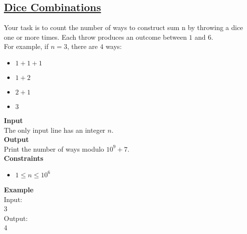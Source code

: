 \subsection{\href{https://cses.fi/problemset/task/1633}{Dice Combinations}}

Your task is to count the number of ways to construct sum n by throwing a dice one or more times. Each throw produces an outcome between $1$ and $6$.\\
\hfill \break
For example, if $n=3$, there are $4$ ways:

\begin{itemize}[noitemsep]
    \item $1+1+1$
    \item $1+2$
    \item $2+1$
    \item $3$
\end{itemize}

\textbf{Input}\\
The only input line has an integer $n$.\\
\hfill \break
\textbf{Output}\\
Print the number of ways modulo $10^9+7$.\\
\hfill \break
\textbf{Constraints}\\
\begin{itemize}[noitemsep]
    \item $1 \leq n \leq 10^6 $
\end{itemize}
\textbf{Example}\\
Input:\\3\\
\hfill \break
Output:\\4